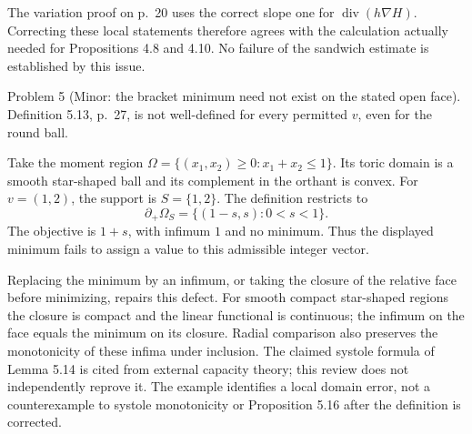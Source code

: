 \documentclass[10pt]{article}
\begin{document}
The variation proof on p. 20 uses the correct slope one for \(\operatorname{div}(h\nabla H)\). Correcting these local statements therefore agrees with the calculation actually needed for Propositions 4.8 and 4.10. No failure of the sandwich estimate is established by this issue.\par
Problem 5 (Minor: the bracket minimum need not exist on the stated open face).  Definition 5.13, p. 27, is not well-defined for every permitted \(v\), even for the round ball.\par
Take the moment region \(\Omega=\{(x_1,x_2)\ge0:x_1+x_2\le1\}\). Its toric domain is a smooth star-shaped ball and its complement in the orthant is convex. For \(v=(1,2)\), the support is \(S=\{1,2\}\). The definition restricts to \[\partial_+\Omega_S=\{(1-s,s):0<s<1\}.\] The objective is \(1+s\), with infimum \(1\) and no minimum. Thus the displayed minimum fails to assign a value to this admissible integer vector.\par
Replacing the minimum by an infimum, or taking the closure of the relative face before minimizing, repairs this defect. For smooth compact star-shaped regions the closure is compact and the linear functional is continuous; the infimum on the face equals the minimum on its closure. Radial comparison also preserves the monotonicity of these infima under inclusion. The claimed systole formula of Lemma 5.14 is cited from external capacity theory; this review does not independently reprove it. The example identifies a local domain error, not a counterexample to systole monotonicity or Proposition 5.16 after the definition is corrected.\par
\end{document}
